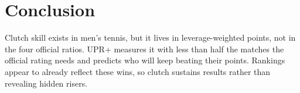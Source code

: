 \section*{Conclusion}
Clutch skill exists in men's tennis, but it lives in leverage-weighted points, not in the four official ratios. UPR+ measures it with less than half the matches the official rating needs and predicts who will keep beating their points. Rankings appear to already reflect these wins, so clutch sustains results rather than revealing hidden risers.
